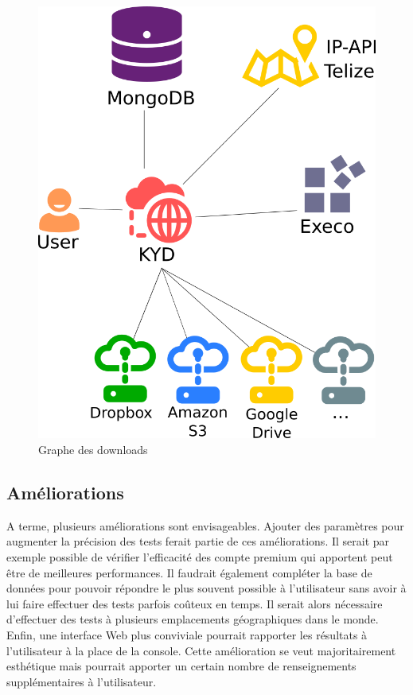 \documentclass[10pt]{article}
\begin{document}
\begin{figure}[h]
\centering
\includegraphics[scale=0.3]{architecture.png}
\caption{Graphe des downloads}
\label{fig:Graphe des downloads}
\end{figure}

\subsection{Améliorations}

A terme, plusieurs améliorations sont envisageables. Ajouter des paramètres pour augmenter la précision des tests ferait partie de ces améliorations. Il serait par exemple possible de vérifier l'efficacité des compte premium qui apportent peut être de meilleures performances. Il faudrait également compléter la base de données pour pouvoir répondre le plus souvent possible à l'utilisateur sans avoir à lui faire effectuer des tests parfois coûteux en temps. Il serait alors nécessaire d'effectuer des tests à plusieurs emplacements géographiques dans le monde. Enfin, une interface Web plus conviviale pourrait rapporter les résultats à l'utilisateur à la place de la console. Cette amélioration se veut majoritairement esthétique mais pourrait apporter un certain nombre de renseignements supplémentaires à l'utilisateur.
\end{document}
